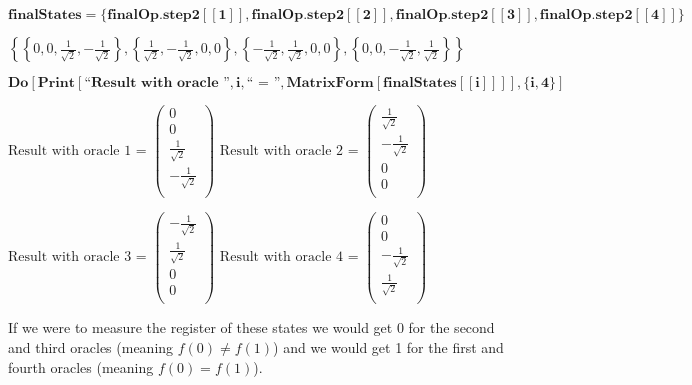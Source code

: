 \begin{doublespace}
    \noindent\(\pmb{\text{finalStates} = \{\text{finalOp}.\text{step2}[[1]], \text{finalOp}.\text{step2}[[2]],\text{finalOp}.\text{step2}[[3]], \text{finalOp}.\text{step2}[[4]]\}}\)
\end{doublespace}
\begin{doublespace}
    \noindent\(\left\{\left\{0,0,\frac{1}{\sqrt{2}},-\frac{1}{\sqrt{2}}\right\},\left\{\frac{1}{\sqrt{2}},-\frac{1}{\sqrt{2}},0,0\right\},\left\{-\frac{1}{\sqrt{2}},\frac{1}{\sqrt{2}},0,0\right\},\left\{0,0,-\frac{1}{\sqrt{2}},\frac{1}{\sqrt{2}}\right\}\right\}\)
\end{doublespace}
\begin{doublespace}
    \noindent\(\pmb{\text{Do}[\text{Print}[\text{{``}Result with oracle {''}},i,\text{{``} = {''}}, \text{MatrixForm}[\text{finalStates}[[i]]]], \{i,
        4\}]}\)
\end{doublespace}
\noindent\(\text{Result with oracle }1\text{ = }\left(
\begin{array}{c}
    0 \\
    0 \\
    \frac{1}{\sqrt{2}} \\
    -\frac{1}{\sqrt{2}} \\
\end{array}
\right)\)
\noindent\(\text{Result with oracle }2\text{ = }\left(
\begin{array}{c}
    \frac{1}{\sqrt{2}} \\
    -\frac{1}{\sqrt{2}} \\
    0 \\
    0 \\
\end{array}
\right)\)

\noindent\(\text{Result with oracle }3\text{ = }\left(
\begin{array}{c}
    -\frac{1}{\sqrt{2}} \\
    \frac{1}{\sqrt{2}} \\
    0 \\
    0 \\
\end{array}
\right)\)
\noindent\(\text{Result with oracle }4\text{ = }\left(
\begin{array}{c}
    0 \\
    0 \\
    -\frac{1}{\sqrt{2}} \\
    \frac{1}{\sqrt{2}} \\
\end{array}
\right)\)

If we were to measure the register of these states we would get 0 for the second and third oracles (meaning \(f(0) \ne f(1)\)) and we would get 1 for
the first and fourth oracles (meaning \(f(0) = f(1)\)).